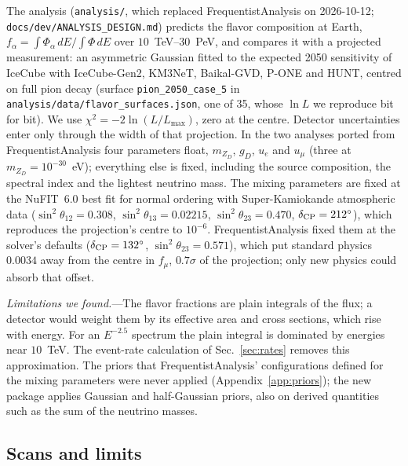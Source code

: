 \documentclass[11pt,a4paper]{article}
\newcommand{\file}[1]{\nolinkurl{#1}}
\newcommand{\mzd}{m_{Z_D}}
\newcommand{\gd}{g_D}
\begin{document}
The analysis (\file{analysis/}, which replaced FrequentistAnalysis on 2026-10-12;
\file{docs/dev/ANALYSIS\_DESIGN.md}) predicts the flavor composition at Earth,
$f_\alpha = \int \Phi_\alpha\,dE / \int \Phi\,dE$ over $10$~TeV--$30$~PeV, and compares it with a
projected measurement: an asymmetric Gaussian fitted to the expected 2050 sensitivity of IceCube
with IceCube-Gen2, KM3NeT, Baikal-GVD, P-ONE and HUNT, centred on full pion decay (surface
\texttt{pion\_2050\_case\_5} in \file{analysis/data/flavor\_surfaces.json}, one of 35, whose
$\ln L$ we reproduce bit for bit). We use $\chi^2 = -2\ln(L/L_{\max})$, zero at the centre.
Detector uncertainties enter only through the width of that projection. In the two analyses
ported from FrequentistAnalysis four parameters float, $\mzd$, $\gd$, $u_e$ and $u_\mu$ (three
at $\mzd = 10^{-30}$~eV); everything else is fixed, including the source composition, the
spectral index and the lightest neutrino mass. The mixing parameters are fixed at the NuFIT~6.0
best fit for normal ordering with Super-Kamiokande atmospheric data ($\sin^2\theta_{12} = 0.308$,
$\sin^2\theta_{13} = 0.02215$, $\sin^2\theta_{23} = 0.470$, $\delta_{\rm CP} = 212^\circ$), which
reproduces the projection's centre to $10^{-6}$. FrequentistAnalysis fixed them at the solver's
defaults ($\delta_{\rm CP} = 132^\circ$, $\sin^2\theta_{23} = 0.571$), which put standard
physics $0.0034$ away from the centre in $f_\mu$, $0.7\sigma$ of the projection; only new physics
could absorb that offset.

\textit{Limitations we found.}---The flavor fractions are plain integrals of the flux; a
detector would weight them by its effective area and cross sections, which rise with energy.
For an $E^{-2.5}$ spectrum the plain integral is dominated by energies near $10$~TeV. The
event-rate calculation of Sec.~\ref{sec:rates} removes this approximation. The priors that
FrequentistAnalysis' configurations defined for the mixing parameters were never applied
(Appendix~\ref{app:priors}); the new package applies Gaussian and half-Gaussian priors, also on
derived quantities such as the sum of the neutrino masses.

\subsection{Scans and limits}
\end{document}
